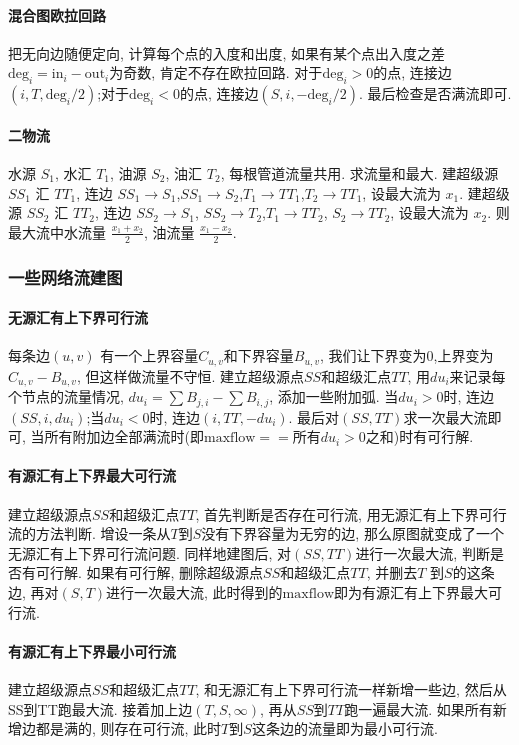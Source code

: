 \paragraph{混合图欧拉回路}把无向边随便定向, 计算每个点的入度和出度, 如果有某个点出入度之差$\mathrm{deg}_i=\mathrm{in}_i-\mathrm{out}_i$为奇数, 肯定不存在欧拉回路. 对于$\mathrm{deg}_i>0$的点, 连接边$(i,T,\mathrm{deg}_i/2)$;对于$\mathrm{deg}_i<0$的点, 连接边$(S,i,-\mathrm{deg}_i/2)$. 最后检查是否满流即可. 
\paragraph{二物流}
水源 $S_1$, 水汇 $T_1$, 油源 $S_2$, 油汇 $T_2$, 每根管道流量共用. 求流量和最大.
建超级源 $SS_1$ 汇 $TT_1$, 连边 $SS_1\to S_1$,$SS_1\to S_2$,$T_1\to TT_1$,$T_2 \to TT_1$, 设最大流为 $x_1$.
建超级源 $SS_2$ 汇 $TT_2$, 连边 $SS_2 \to S_1$, $SS_2\to T_2$,$T_1\to TT_2$, $S_2\to TT_2$, 设最大流为 $x_2$.
则最大流中水流量 $\frac{x_1 + x_2}{2}$, 油流量 $\frac{x_1-x_2}{2}$.

\subsubsection{一些网络流建图}
\paragraph{无源汇有上下界可行流}
每条边$(u,v)$ 有一个上界容量$C_{u,v}$和下界容量$B_{u,v}$, 我们让下界变为$0$,上界变为$C_{u,v}-B_{u,v}$, 但这样做流量不守恒. 建立超级源点$SS$和超级汇点$TT$, 用$du_i$来记录每个节点的流量情况, $du_i=\sum B_{j,i}-\sum B_{i,j}$, 添加一些附加弧. 当$du_i>0$时, 连边$(SS,i,du_i)$;当$du_i<0$时, 连边$(i,TT,-du_i)$. 最后对$(SS,TT)$求一次最大流即可, 当所有附加边全部满流时(即$\mathrm{maxflow}==所有du_i>0之和$)时有可行解. 
\paragraph{有源汇有上下界最大可行流}
建立超级源点$SS$和超级汇点$TT$, 首先判断是否存在可行流, 用无源汇有上下界可行流的方法判断. 增设一条从$T$到$S$没有下界容量为无穷的边, 那么原图就变成了一个无源汇有上下界可行流问题. 同样地建图后, 对$(SS,TT)$进行一次最大流, 判断是否有可行解. 
如果有可行解, 删除超级源点$SS$和超级汇点$TT$, 并删去$T$ 到$S$的这条边, 再对$(S,T)$进行一次最大流, 此时得到的$\mathrm{maxflow}$即为有源汇有上下界最大可行流. 
\paragraph{有源汇有上下界最小可行流}
建立超级源点$SS$和超级汇点$TT$, 和无源汇有上下界可行流一样新增一些边, 然后从SS到TT跑最大流. 接着加上边$(T,S,\infty)$, 再从$SS$到$TT$跑一遍最大流. 
如果所有新增边都是满的, 则存在可行流, 此时$T$到$S$这条边的流量即为最小可行流. 
